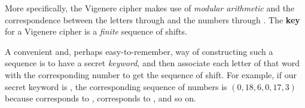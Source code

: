 \documentclass[letterpaper]{article}
\newcommand{\0}{\mathbf{0}}
\begin{document}
\bigskip 

More specifically, the Vigenere cipher makes use of \emph{modular arithmetic} and the correspondence between the letters  through  and the numbers  through . The \textbf{key} for a Vigenere cipher is a \emph{finite} sequence of shifts. 

\bigskip 

A convenient and, perhaps easy-to-remember, way of constructing such a sequence is to have a secret \emph{keyword}, and then associate each letter of that word with the corresponding number to get the sequence of shift. For example, if our secret keyword is , the corresponding sequence of numbers is $(0, 18, 6, 0, 17, 3)$ because  corresponds to ,  corresponds to , and so on.
\end{document}
